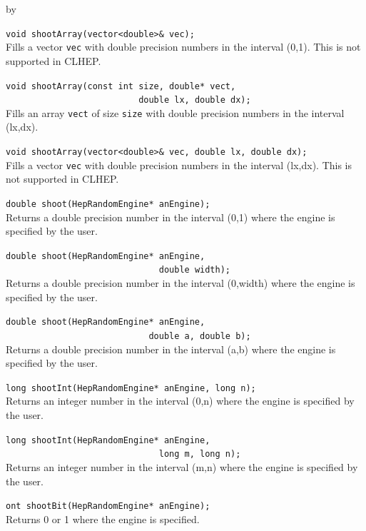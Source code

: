 \documentclass[twoside]{article}
\newcommand{\comp}[1]{\texttt{#1}}%
\newcommand{\entrylabel}[1]{\mbox{\textbf{{#1}}}\hfil}%
\newenvironment{entry}
{\begin{list}{}%
    {\renewcommand{\makelabel}{\entrylabel}%
     \setlength{\labelwidth}{90pt}%
     \setlength{\leftmargin}{\labelwidth}
     \advance\leftmargin by \labelsep%
      }%
    }%
  {\end{list}}
\newcommand{\Entrylabel}[1]%
{\raisebox{0pt}[1ex][0pt]{\makebox[\labelwidth][l]%
    {\parbox[t]{\labelwidth}{\hspace{0pt}\textbf{{#1}}}}}}
\newenvironment{Entry}%
{\renewcommand{\entrylabel}{\Entrylabel}\begin{entry}}%
  {\end{entry}}
\begin{document}
\begin{Entry}
    \verb+void shootArray(vector<double>& vec);+\\
    Fills a vector \comp{vec} with double
    precision numbers in the interval (0,1).
    This is not supported in CLHEP.

    \verb+void shootArray(const int size, double* vect,+\\
    \verb+                          double lx, double dx);+\\
    Fills an array \comp{vect} of size \comp{size} with double
    precision numbers in the interval (lx,dx).

    \verb+void shootArray(vector<double>& vec, double lx, double dx);+\\
    Fills a vector \comp{vec} with double
    precision numbers in the interval (lx,dx).
    This is not supported in CLHEP.
    
    \verb+double shoot(HepRandomEngine* anEngine);+\\
    Returns a double precision number in the interval (0,1)
    where the engine is specified by the user.
    
    \verb+double shoot(HepRandomEngine* anEngine,+\\
    \verb+                              double width);+\\
    Returns a double precision number in the interval (0,width)
    where the engine is specified by the user.
    
    \verb+double shoot(HepRandomEngine* anEngine,+\\
    \verb+                            double a, double b);+\\
    Returns a double precision number in the interval (a,b)
    where the engine is specified by the user.
    
    \verb+long shootInt(HepRandomEngine* anEngine, long n);+\\
    Returns an integer number in the interval (0,n)
    where the engine is specified by the user.
    
    \verb+long shootInt(HepRandomEngine* anEngine,+\\
    \verb+                              long m, long n);+\\
    Returns an integer number in the interval (m,n)
    where the engine is specified by the user.
    
    \verb+ont shootBit(HepRandomEngine* anEngine);+\\
    Returns 0 or 1 where the engine is specified.
    

\end{Entry}
\end{document}
